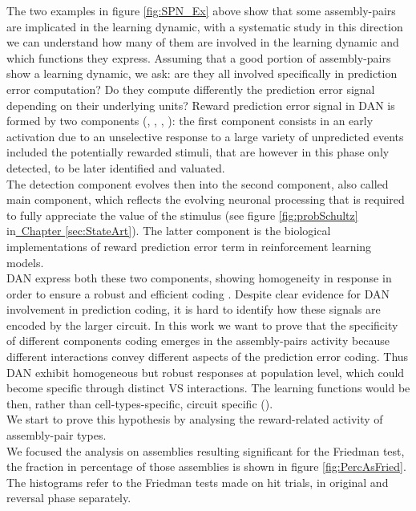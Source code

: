The two examples in figure \ref{fig:SPN_Ex} above show that some assembly-pairs are implicated in the learning dynamic, with a systematic study in this direction we can understand how many of them are involved in the learning dynamic and which functions they express. Assuming that a good portion of assembly-pairs show a learning dynamic, we ask: are they all involved specifically in prediction error computation? Do they compute differently the prediction error signal depending on their underlying units? Reward prediction error signal in DAN is formed by two components (\cite{Tobler2003}, \cite{Nomoto2010}, \cite{Fiorillo2013}, \cite{Schultz2016}): the first component consists in an early activation due to an unselective response to a large variety of unpredicted events included the potentially rewarded stimuli, that are however in this phase only detected, to be later identified and valuated.\\The detection component evolves then into the second component, also called main component, which reflects the evolving neuronal processing that is required to fully appreciate the value of the stimulus (see figure \ref{fig:probSchultz} in\hyperref[sec:StateArt]{~Chapter \ref*{sec:StateArt}}). The latter component is the biological implementations of reward prediction error term in reinforcement learning models.\\DAN express both these two components, showing homogeneity in response in order to ensure a robust and efficient coding \cite{UchidaDop}. Despite clear evidence for DAN involvement in prediction coding, it is hard to identify how these signals are encoded by the larger circuit. In this work we want to prove that the specificity of different components coding emerges in the assembly-pairs activity because different interactions convey different aspects of the prediction error coding. Thus DAN exhibit homogeneous but robust responses at population level, which could become specific through distinct VS interactions. The learning functions would be then, rather than cell-types-specific, circuit specific (\cite{Saunders2018}).\\
We start to prove this hypothesis by analysing the reward-related activity of assembly-pair types.\\
We focused the analysis on assemblies resulting significant for the Friedman test, the fraction in percentage of those assemblies is shown in figure \ref{fig:PercAsFried}. The histograms refer to the Friedman tests made on hit trials, in original and reversal phase separately.\\
